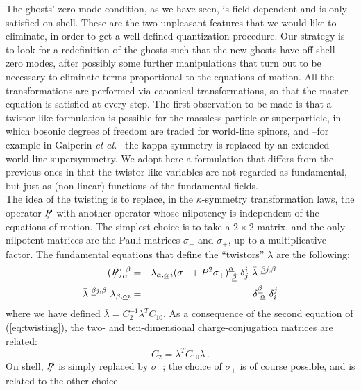 \documentclass[a4paper,12pt]{article}
\begin{document}
The ghosts' zero mode condition, as we have seen, is field-dependent
and is only satisfied on-shell. These are the two unpleasant features
that we would like to eliminate, in order to get a well-defined
quantization procedure. Our strategy is to look for a redefinition of
the ghosts such that the new ghosts have off-shell zero modes, after
possibly some further manipulations that turn out to be necessary to
eliminate terms proportional to the equations of motion.  All the
transformations are performed via canonical transformations, so that
the master equation is satisfied at every step.  The first observation
to be made is that a twistor-like formulation\cite{twistor-like} is
possible for the massless particle or superparticle, in which bosonic
degrees of freedom are traded for world-line spinors, and --for
example in Galperin {\it et al.}-- the kappa-symmetry is replaced by
an extended world-line supersymmetry.  We adopt here a formulation
that differs from the previous ones in that the twistor-like variables
are not regarded as fundamental, but just as (non-linear)
functions of the fundamental fields. \\
The idea of the twisting is to replace, in the $\kappa$-symmetry
transformation laws, the operator $\SL{P}$ with another operator whose
nilpotency is independent of the equations of motion. The simplest
choice is to take a $2 \times 2$ matrix, and the only nilpotent
matrices are the Pauli matrices $\sigma_-$ and $\sigma_+$, up to a
multiplicative factor.  The fundamental equations that define the
``twistors'' $\lambda$ are the following:
\begin{eqnarray}
  \label{eq:twisting}
  (\SL{P})_\alpha^{~\beta} &=& \lambda_{\alpha,\underline{\alpha}\, i}
  (\sigma_- + P^2 
  \sigma_+)^{\underline{\alpha}}_{~\underline{\beta}} ~\delta^i_j
  ~\bar\lambda^{~\underline{\beta}j,\beta} \,
    \nonumber \\ 
  \bar\lambda^{~\underline{\beta}j,\beta}
  ~\lambda_{\beta,\underline{\alpha}i}  &=& 
   \delta^{\underline\beta}_{~\underline\alpha} ~\delta^j_i 
\end{eqnarray}
where we have defined $\bar \lambda = C_2^{-1} \lambda^T C_{10}$. As 
a consequence of the second equation of (\ref{eq:twisting}), the two- 
and ten-dimensional charge-conjugation matrices are related:
\begin{equation}
  C_2 = \lambda^T C_{10} \lambda \, .
\end{equation}
On shell, $\SL{P}$ is simply replaced by $\sigma_-$; the choice of
$\sigma_+$ is of course possible, and is related to the other choice
\end{document}
